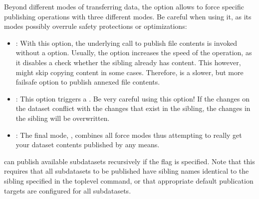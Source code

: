 \sphinxAtStartPar
Beyond different modes of transferring data, the  option allows to force specific publishing operations with three different modes.
Be careful when using it, as its modes possibly overrule safety protections or optimizations:
\begin{itemize}
\item {} 
\sphinxAtStartPar
{}: With this option, the underlying  call to
publish file contents is invoked without a  option. Usually, the
 option increases the speed of the operation, as it disables a check
whether the sibling already has content. This however, might skip copying content
in some cases. Therefore,  is a slower, but more fail\sphinxhyphen{}safe
option to publish annexed file contents.

\item {} 
\sphinxAtStartPar
{}: This option triggers a . Be very careful using
this option! If the changes on the dataset conflict with the changes that exist
in the sibling, the changes in the sibling will be overwritten.

\item {} 
\sphinxAtStartPar
{}: The final mode, , combines all force modes \textendash{} thus attempting to really get your dataset contents published by any means.

\end{itemize}

\sphinxAtStartPar
{} can publish available subdatasets recursively if the
 flag is specified. Note that this requires that all subdatasets
to be published have sibling names identical to the sibling specified in
the top\sphinxhyphen{}level  command, or that appropriate default publication
targets are configured for all subdatasets.
\enlargethispage{.5\baselineskip}

